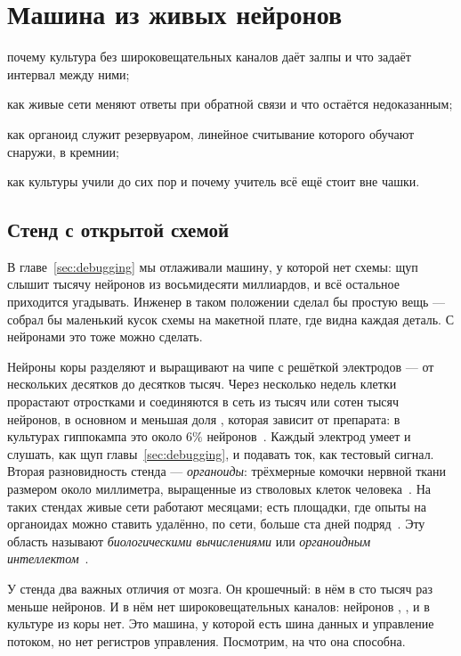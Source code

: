 \chapter{Машина из живых нейронов}
\label{sec:livingmachine}
\begin{chaptergoals}
\item почему культура без широковещательных каналов даёт залпы и что задаёт интервал между ними;
\item как живые сети меняют ответы при обратной связи и что остаётся недоказанным;
\item как органоид служит резервуаром, линейное считывание которого обучают снаружи, в кремнии;
\item как культуры учили до сих пор и почему учитель всё ещё стоит вне чашки.
\end{chaptergoals}

\section{Стенд с открытой схемой}

В главе~\ref{sec:debugging} мы отлаживали машину, у которой нет схемы: щуп слышит тысячу нейронов из восьмидесяти миллиардов, и всё остальное приходится угадывать. Инженер в таком положении сделал бы простую вещь --- собрал бы маленький кусок схемы на макетной плате, где видна каждая деталь. С нейронами это тоже можно сделать.

Нейроны коры разделяют и выращивают на чипе с решёткой электродов --- от нескольких десятков до десятков тысяч. Через несколько недель клетки прорастают отростками и соединяются в сеть из тысяч или сотен тысяч нейронов, в основном  и меньшая доля , которая зависит от препарата: в культурах гиппокампа это около $6\%$ нейронов~\cite{Benson1994}. Каждый электрод умеет и слушать, как щуп главы~\ref{sec:debugging}, и подавать ток, как тестовый сигнал. Вторая разновидность стенда --- \emph{органоиды}: трёхмерные комочки нервной ткани размером около миллиметра, выращенные из стволовых клеток человека~\cite{Lancaster2013}. На таких стендах живые сети работают месяцами; есть площадки, где опыты на органоидах можно ставить удалённо, по сети, больше ста дней подряд~\cite{Jordan2024}. Эту область называют \emph{биологическими вычислениями} или \emph{органоидным интеллектом}~\cite{Smirnova2023}.

У стенда два важных отличия от мозга. Он крошечный: в нём в сто тысяч раз меньше нейронов. И в нём нет широковещательных каналов: нейронов , ,  и  в культуре из коры нет. Это машина, у которой есть шина данных и управление потоком, но нет регистров управления. Посмотрим, на что она способна.

